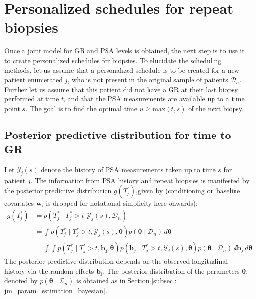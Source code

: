 
\section{Personalized schedules for repeat biopsies}
\label{sec : pers_sched_approaches}
Once a joint model for GR and PSA levels is obtained, the next step is to use it to create personalized schedules for biopsies. To elucidate the scheduling methods, let us assume that a personalized schedule is to be created for a new patient enumerated $j$, who is not present in the original sample of patients $\mathcal{D}_n$. Further let us assume that this patient did not have a GR at their last biopsy performed at time $t$, and that the PSA measurements are available up to a time point $s$. The goal is to find the optimal time $u \geq \text{max}(t,s)$ of the next biopsy.

\subsection{Posterior predictive distribution for time to GR}
\label{subsec : ppd_time_to_GR}
Let $\mathcal{Y}_j(s)$ denote the history of PSA measurements taken up to time $s$ for patient $j$. The information from PSA history and repeat biopsies is manifested by the posterior predictive distribution $g(T^*_j)$,given by (conditioning on baseline covariates $\boldsymbol{w}_i$ is dropped for notational simplicity here onwards):
\begin{equation}
\label{eq : dyn_dist_fail_time}
\begin{split}
g(T^*_j) &= p(T^*_j \mid T^*_j > t, \mathcal{Y}_j(s), \mathcal{D}_n)\\
&= \int p(T^*_j \mid T^*_j > t, \mathcal{Y}_j(s), \boldsymbol{\theta}) p(\boldsymbol{\theta} \mid \mathcal{D}_n) \,d\boldsymbol{\theta}\\
&= \int \int p(T^*_j \mid T^*_j > t, \boldsymbol{b_j}, \boldsymbol{\theta}) p(\boldsymbol{b}_j \mid T^*_j>t, \mathcal{Y}_j(s), \boldsymbol{\theta})p(\boldsymbol{\theta} \mid \mathcal{D}_n) \,d\boldsymbol{b}_j \,d\boldsymbol{\theta}
\end{split}
\end{equation}
The posterior predictive distribution depends on the observed longitudinal history via the random effects $\boldsymbol{b_j}$. The posterior distribution of the parameters $\boldsymbol{\theta}$, denoted by $p(\boldsymbol{\theta} \mid \mathcal{D}_n)$ is obtained as in Section \ref{subsec : jm_param_estimation_bayesian}.

